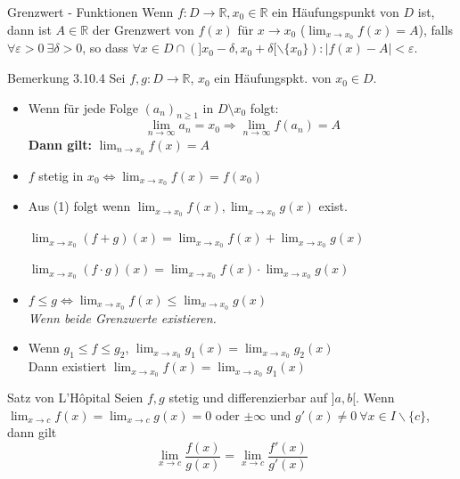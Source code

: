 \documentclass[a4paper,10pt]{article}
\def\R{\mathbb{R}}
\begin{document}
\begin{mainbox}{Grenzwert - Funktionen}
	Wenn $f: D \to \R, x_0 \in \R$ ein Häufungspunkt von $D$ ist, dann ist $A \in \R$ der Grenzwert von $f(x)$ für $x \to x_0$ ($\lim_{x\to x_0} f(x) = A$), falls $\forall \varepsilon > 0 \ \exists \delta > 0$, so dass $\forall x \in D \cap (]x_0 - \delta, x_0 + \delta[ \backslash \{x_0\}): |f(x) - A| < \varepsilon$.
\end{mainbox}

\begin{subbox}{Bemerkung 3.10.4}
	Sei $f,g: D \rightarrow \mathbb{R}$, $x_0$ ein Häufungspkt. von $x_0\in D$.
	\begin{itemize}
		\item[(1)] Wenn für jede Folge $(a_n)_{n\geq 1}$ in $D\setminus x_0$ folgt:
		      $$\lim_{n\rightarrow\infty} a_n = x_0 \Longrightarrow \lim_{n\rightarrow\infty} f(a_n) = A $$
		      \textbf{Dann gilt:} $\lim_{n\rightarrow x_0} f(x) = A $
		\item[(2)] $f$ stetig in $x_0 \Longleftrightarrow \lim_{x\rightarrow x_0} f(x) =f(x_0)$ 
		\item[(3)] Aus (1) folgt wenn $\displaystyle\lim_{x\rightarrow x_0} f(x), \lim_{x\rightarrow x_0} g(x) $  exist.\\
		      \centerline{$\displaystyle\lim_{x\rightarrow x_0}(f+g)(x)= \lim_{x\rightarrow x_0}f(x)+ \lim_{x\rightarrow x_0}g(x)$}
		      \centerline{$\displaystyle\lim_{x\rightarrow x_0}(f\cdot g)(x)= \lim_{x\rightarrow x_0}f(x) \cdot \lim_{x\rightarrow x_0}g(x)$}
		\item[(4)] $f\leq g \Longleftrightarrow \lim_{x\rightarrow x_0} f(x) \leq \lim_{x\rightarrow x_0} g(x)$\\
		      \textit{Wenn beide Grenzwerte existieren.}
		\item[(5)] Wenn $g_1 \leq f \leq g_2$, $\displaystyle\lim_{x\rightarrow x_0} g_1(x)= \lim_{x\rightarrow x_0} g_2(x)$\\
		      Dann existiert $\displaystyle\lim_{x\rightarrow x_0} f(x)= \lim_{x\rightarrow x_0} g_1(x)$
	\end{itemize}
\end{subbox}


\begin{subbox}{Satz von L'Hôpital}
	Seien $f,g$ stetig und differenzierbar auf $]a,b[$. Wenn $\lim_{x\to c} f(x) = \lim_{x \to c} g(x) = 0$ oder $\pm \infty$ und $g'(x) \ne 0 \ \forall x \in I \backslash \{c\}$, dann gilt $$\lim_{x\to c} \frac{f(x)}{g(x)} = \lim_{x\to c}\frac{f'(x)}{g'(x)}$$
\end{subbox}
\end{document}
